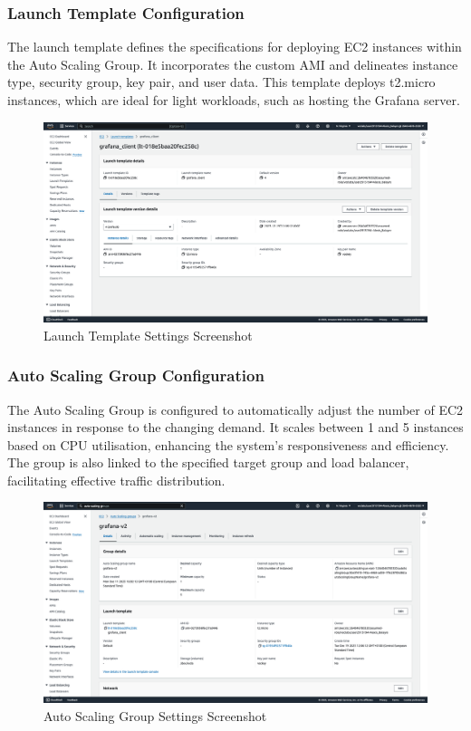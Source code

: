 \documentclass[12pt,oneside]{book} %
\begin{document}
\newpage
\subsubsection{Launch Template Configuration}
The launch template defines the specifications for deploying EC2 instances
within the Auto Scaling Group. It incorporates the custom AMI and delineates
instance type, security group, key pair, and user data. This template deploys
t2.micro instances, which are ideal for light workloads, such as hosting the
Grafana server.
\begin{figure}[H]
    \centering
    \includegraphics[width=1\linewidth]{images/launch-template.png}
    \caption{Launch Template Settings Screenshot}\label{fig:launch-template-settings}
\end{figure}

\newpage
\subsubsection{Auto Scaling Group Configuration}
The Auto Scaling Group is configured to automatically adjust the number of EC2
instances in response to the changing demand. It scales between 1 and 5
instances based on CPU utilisation, enhancing the system's responsiveness and
efficiency. The group is also linked to the specified target group and load
balancer, facilitating effective traffic distribution.
\begin{figure}[H]
    \centering
    \includegraphics[width=1\linewidth]{images/auto-scaling-group.png}
    \caption{Auto Scaling Group Settings Screenshot}\label{fig:auto-scaling-group-settings}
\end{figure}
\end{document}
